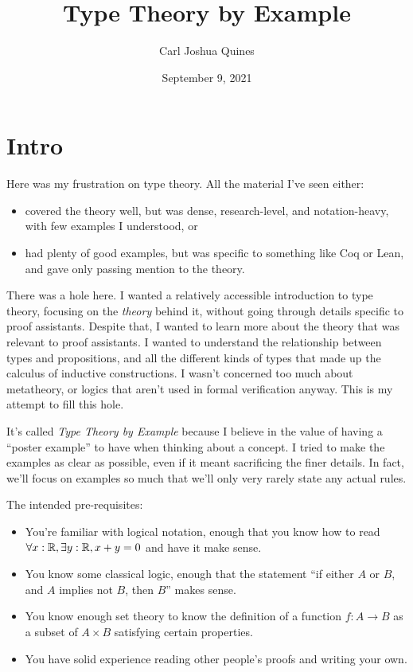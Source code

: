 \documentclass[11pt,paper=letter]{scrartcl}
\begin{document}
\title{Type Theory by Example}
\author{Carl Joshua Quines}
\date{September 9, 2021}

\maketitle

\tableofcontents

\clearpage

\section{Intro}

Here was my frustration on type theory. All the material I've seen either:
\begin{itemize}
\item covered the theory well, but was dense, research-level, and notation-heavy, with few examples I understood, or
\item had plenty of good examples, but was specific to something like Coq or Lean, and gave only passing mention to the theory.
\end{itemize}
There was a hole here. I wanted a relatively accessible introduction to type theory, focusing on the \emph{theory} behind it, without going through details specific to proof assistants. Despite that, I wanted to learn more about the theory that was relevant to proof assistants. I wanted to understand the relationship between types and propositions, and all the different kinds of types that made up the calculus of inductive constructions. I wasn't concerned too much about metatheory, or logics that aren't used in formal verification anyway. This is my attempt to fill this hole.

It's called \emph{Type Theory by Example} because I believe in the value of having a ``poster example'' to have when thinking about a concept. I tried to make the examples as clear as possible, even if it meant sacrificing the finer details. In fact, we'll focus on examples so much that we'll only very rarely state any actual rules.

The intended pre-requisites:

\begin{itemize}
\item You're familiar with logical notation, enough that you know how to read $\forall x: \mathbb R, \exists y: \mathbb R, x + y = 0$ and have it make sense.

\item You know some classical logic, enough that the statement ``if either $A$ or $B$, and $A$ implies not $B$, then $B$'' makes sense.

\item You know enough set theory to know the definition of a function $f : A \to B$ as a subset of $A \times B$ satisfying certain properties.

\item You have solid experience reading other people's proofs and writing your own.
\end{itemize}
\end{document}
